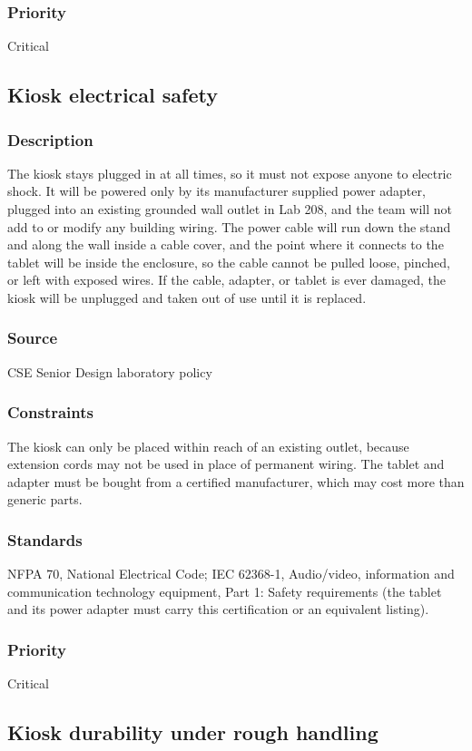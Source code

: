 \subsubsection{Priority}
Critical

\subsection{Kiosk electrical safety}
\subsubsection{Description}
The kiosk stays plugged in at all times, so it must not expose anyone to electric shock. It will be powered only by its manufacturer supplied power adapter, plugged into an existing grounded wall outlet in Lab 208, and the team will not add to or modify any building wiring. The power cable will run down the stand and along the wall inside a cable cover, and the point where it connects to the tablet will be inside the enclosure, so the cable cannot be pulled loose, pinched, or left with exposed wires. If the cable, adapter, or tablet is ever damaged, the kiosk will be unplugged and taken out of use until it is replaced.
\subsubsection{Source}
CSE Senior Design laboratory policy
\subsubsection{Constraints}
The kiosk can only be placed within reach of an existing outlet, because extension cords may not be used in place of permanent wiring. The tablet and adapter must be bought from a certified manufacturer, which may cost more than generic parts.
\subsubsection{Standards}
NFPA 70, National Electrical Code; IEC 62368-1, Audio/video, information and communication technology equipment, Part 1: Safety requirements (the tablet and its power adapter must carry this certification or an equivalent listing).
\subsubsection{Priority}
Critical

\subsection{Kiosk durability under rough handling}

